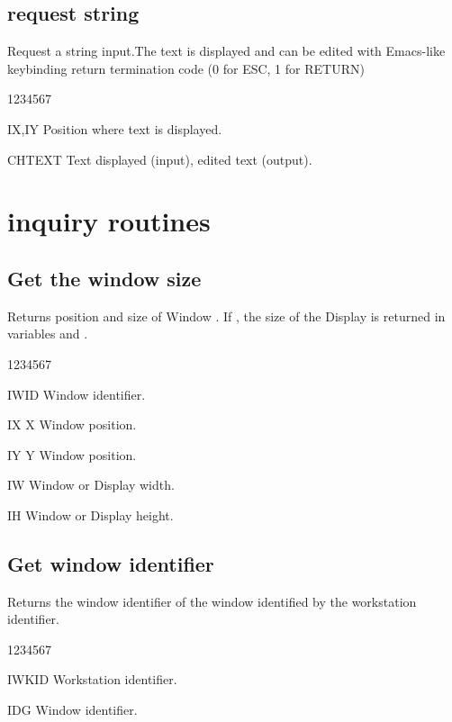 \subsection{ request string}
%
\Action
Request a string input.The text is displayed and can be edited with
Emacs-like keybinding
return termination code (0 for ESC, 1 for RETURN)
\Pdesc
\begin{DLtt}{1234567}
\item[IX,IY] Position where text is displayed.
\item[CHTEXT] Text displayed (input), edited text (output).
\end{DLtt}

\section{ inquiry routines}
\subsection{Get the window size}
%
\Action
Returns position and size of Window .
If , the size of the Display is returned in
variables  and .
\Pdesc
\begin{DLtt}{1234567}
\item[IWID] Window identifier.
\item[IX] X Window position.
\item[IY] Y Window position.
\item[IW] Window or Display width.
\item[IH] Window or Display height.
\end{DLtt}

\newpage%

\subsection{Get window identifier}
%
\Action
Returns the  window identifier of the window identified by the
workstation identifier.
\Pdesc
\begin{DLtt}{1234567}
\item[IWKID] Workstation identifier.
\item[IDG] Window identifier.
\end{DLtt}
